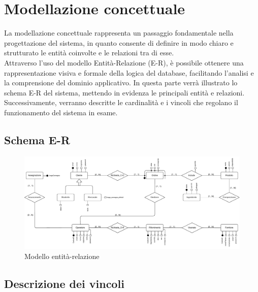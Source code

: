\documentclass[12pt,a4paper]{article}
\begin{document}
    \newpage
    \section{Modellazione concettuale} 
    La modellazione concettuale rappresenta un passaggio fondamentale nella progettazione del sistema, in quanto consente di definire in modo chiaro e strutturato le entità coinvolte e le relazioni tra di esse.\\
    Attraverso l'uso del modello Entità-Relazione (E-R), è possibile ottenere una rappresentazione visiva e formale della logica del database, facilitando l'analisi e la comprensione del dominio applicativo. In questa parte verrà illustrato lo schema E-R del sistema, mettendo in evidenza le principali entità e relazioni. Successivamente, verranno descritte le cardinalità e i vincoli che regolano il funzionamento del sistema in esame.

    \subsection{Schema E-R}
    \begin{figure}[H]
        \centering
        \vspace{-20pt}  %
        \includegraphics[width=1\textwidth]{figures/Conceptual_model.pdf}
        \vspace{-20pt}  %
        \caption{Modello entità-relazione}
        \label{fig:Conceptual_model}
    \end{figure} 

    \subsection{Descrizione dei vincoli}
\end{document}

